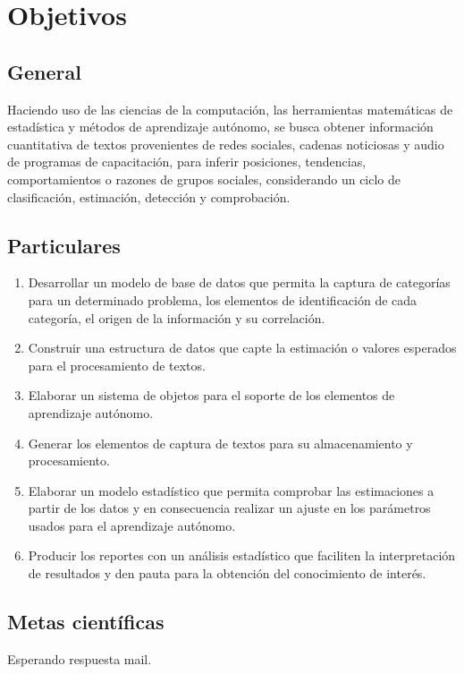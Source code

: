 \section {Objetivos}
\subsection {General}
Haciendo uso de las ciencias de la computación, las herramientas matemáticas de estadística y métodos de aprendizaje autónomo, se busca obtener información cuantitativa de textos provenientes de redes sociales, cadenas noticiosas y audio de programas de capacitación, para inferir posiciones, tendencias, comportamientos o razones de grupos sociales, considerando un ciclo de clasificación, estimación, detección y comprobación.
\subsection {Particulares}
\begin{enumerate}
    \item Desarrollar un modelo de base de datos que permita la captura de categorías para un determinado problema, los elementos de identificación de cada categoría, el origen de la información y su correlación.
    \item Construir una estructura de datos que capte la estimación o valores esperados para el procesamiento de textos.
    \item Elaborar un sistema de objetos para el soporte de los elementos de aprendizaje autónomo.
    \item Generar los elementos de captura de textos para su almacenamiento y procesamiento.
    \item Elaborar un modelo estadístico que permita comprobar las estimaciones a partir de los datos y en consecuencia realizar un ajuste en los parámetros usados para el aprendizaje autónomo.
    \item Producir los reportes con un análisis estadístico que faciliten la interpretación de resultados y den pauta para la obtención del conocimiento de interés.
\end{enumerate}
\subsection {Metas científicas}
Esperando respuesta mail.